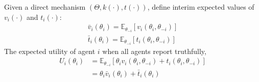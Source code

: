 \documentclass[11pt]{elegantbook_2}
\begin{document}
Given a direct mechanism $\left(\Theta,k(\cdot),t(\cdot)\right)$, define interim expected values of $v_i(\cdot)$ and $t_i(\cdot)$:
\begin{equation}
    \begin{aligned}
        \bar{v}_i(\theta_i)=\mathbb{E}_{\theta_{-i}}\left[v_i(\theta_i,\theta_{-i})\right]\\
        \bar{t}_i(\theta_i)=\mathbb{E}_{\theta_{-i}}\left[t_i(\theta_i,\theta_{-i})\right]
    \end{aligned}
    \nonumber
\end{equation}
The expected utility of agent $i$ when all agents report truthfully,
\begin{equation}
    \begin{aligned}
        U_i(\theta_i)&=\mathbb{E}_{\theta_{-i}}\left[\theta_iv_i(\theta_i,\theta_{-i})+t_i(\theta_i,\theta_{-i})\right]\\
        &=\theta_i \bar{v}_i(\theta_i)+\bar{t}_i(\theta_i)
    \end{aligned}
    \nonumber
\end{equation}
\end{document}
